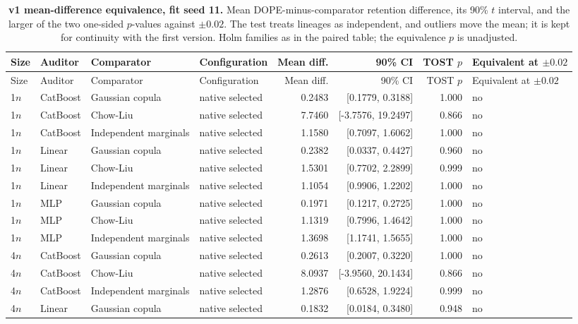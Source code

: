 \begin{longtable}{llllrrrl}
\caption{\textbf{v1 mean-difference equivalence, fit seed 11.} Mean DOPE-minus-comparator retention difference, its 90\% $t$ interval, and the larger of the two one-sided $p$-values against $\pm 0.02$. The test treats lineages as independent, and outliers move the mean; it is kept for continuity with the first version. Holm families as in the paired table; the equivalence $p$ is unadjusted.}\label{tab:review-tost}\\
\toprule
Size & Auditor & Comparator & Configuration & Mean diff. & 90\% CI & TOST $p$ & Equivalent at $\pm 0.02$ \\
\midrule
\endfirsthead
\toprule
Size & Auditor & Comparator & Configuration & Mean diff. & 90\% CI & TOST $p$ & Equivalent at $\pm 0.02$ \\
\midrule
\endhead
1$n$ & CatBoost & Gaussian copula & native selected & 0.2483 & [0.1779, 0.3188] & 1.000 & no \\
1$n$ & CatBoost & Chow-Liu & native selected & 7.7460 & [-3.7576, 19.2497] & 0.866 & no \\
1$n$ & CatBoost & Independent marginals & native selected & 1.1580 & [0.7097, 1.6062] & 1.000 & no \\
1$n$ & Linear & Gaussian copula & native selected & 0.2382 & [0.0337, 0.4427] & 0.960 & no \\
1$n$ & Linear & Chow-Liu & native selected & 1.5301 & [0.7702, 2.2899] & 0.999 & no \\
1$n$ & Linear & Independent marginals & native selected & 1.1054 & [0.9906, 1.2202] & 1.000 & no \\
1$n$ & MLP & Gaussian copula & native selected & 0.1971 & [0.1217, 0.2725] & 1.000 & no \\
1$n$ & MLP & Chow-Liu & native selected & 1.1319 & [0.7996, 1.4642] & 1.000 & no \\
1$n$ & MLP & Independent marginals & native selected & 1.3698 & [1.1741, 1.5655] & 1.000 & no \\
4$n$ & CatBoost & Gaussian copula & native selected & 0.2613 & [0.2007, 0.3220] & 1.000 & no \\
4$n$ & CatBoost & Chow-Liu & native selected & 8.0937 & [-3.9560, 20.1434] & 0.866 & no \\
4$n$ & CatBoost & Independent marginals & native selected & 1.2876 & [0.6528, 1.9224] & 0.999 & no \\
4$n$ & Linear & Gaussian copula & native selected & 0.1832 & [0.0184, 0.3480] & 0.948 & no \\

\end{longtable}

